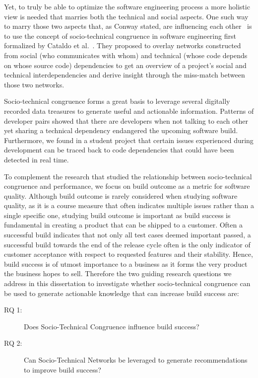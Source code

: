 Yet, to truly be able to optimize the software engineering process a more holistic view is needed that marries both the technical and social aspects.
One such way to marry those two aspects that, as Conway stated, are influencing each other~\cite{conway:datamination:1968} is to use the concept of socio-technical congruence in software engineering first formalized by Cataldo et al.~\cite{cataldo:cscw:2006}.
They proposed to overlay networks constructed from social (who communicates with whom) and technical (whose code depends on whose source code) dependencies to get an overview of a project's social and technical interdependencies and derive insight through the miss-match between those two networks.



Socio-technical congruence forms a great basis to leverage several digitally recorded data treasures to generate useful and actionable information.
Patterns of developer pairs showed that there are developers when not talking to each other yet sharing a technical dependency endangered the upcoming software build.
Furthermore, we found in a student project that certain issues experienced during development can be traced back to code dependencies that could have been detected in real time.

To complement the research that studied the relationship between socio-technical congruence and performance, we focus on build outcome as a metric for software quality.
Although build outcome is rarely considered when studying software quality, as it is a course measure that often indicates multiple issues rather than a single specific one, studying build outcome is important as build success is fundamental in creating a product that can be shipped to a customer.
Often a successful build indicates that not only all test cases deemed important passed, a successful build towards the end of the release cycle often is the only indicator of customer acceptance with respect to requested features and their stability.
Hence, build success is of utmost importance to a business as it forms the very product the business hopes to sell.
Therefore the two guiding research questions we address in this dissertation to investigate whether socio-technical congruence can be used to generate actionable knowledge that can increase build success are:
\begin{description}
\item[RQ 1:] Does Socio-Technical Congruence influence build success?
\item[RQ 2:] Can Socio-Technical Networks be leveraged to generate recommendations to improve build success?
\end{description}

